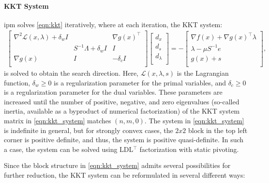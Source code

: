 \documentclass{article}
\begin{document}
\paragraph{KKT System}
\Gls*{ipm} solves \cref{eqn:kkt} iteratively, where at each iteration, the KKT system:
\begin{align}\label{eqn:kkt_system}
  \begin{bmatrix}
    \nabla^2 \mathcal{L}(x,\lambda) + \delta_w I&  & \nabla g(x)^\top \\
     & S^{-1}\Lambda + \delta_w I& I\\
    \nabla g(x) & I & - \delta_c I\\
  \end{bmatrix}
  \begin{bmatrix}
    d_x\\
    d_s\\
    d_\lambda\\
  \end{bmatrix} =
  -\begin{bmatrix}
    \nabla f(x) + \nabla g(x)^\top \lambda\\
    \lambda - \mu S^{-1} e\\
    g(x) + s\\
  \end{bmatrix},
\end{align}
is solved to obtain the search direction. Here, $\mathcal{L}(x,\lambda,s)$ is the Lagrangian function, $\delta_w\geq 0$ is a regularization parameter for the primal variables, and $\delta_c\geq 0$ is a regularization parameter for the dual variables.
These parameters are increased until the number of positive, negative, and zero eigenvalues (so-called inertia, available as a byproduct of numerical factorization) of the KKT system matrix in \eqref{eqn:kkt_system} matches $(n, m, 0)$.
The system in \eqref{eqn:kkt_system} is indefinite in general, but for strongly convex cases, the $2x2$ block in the top left corner is positive definite, and thus, the system is positive quasi-definite. In such a case, the system can be solved using LDL$^\top$ factorization with static pivoting.

Since the block structure in \cref{eqn:kkt_system} admits several possibilities for further reduction, the KKT system can be reformulated in several different ways:
\end{document}
